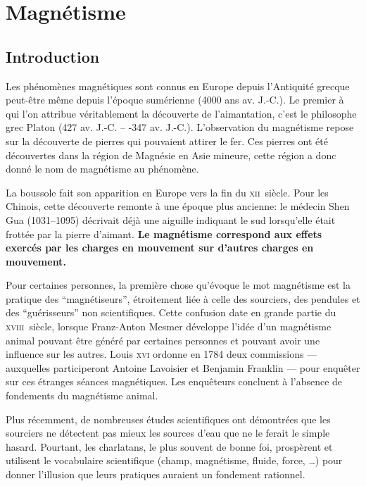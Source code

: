 \chapter{Magnétisme}
\section{Introduction}
Les phénomènes magnétiques sont connus en Europe depuis l'Antiquité grecque peut-être même depuis l'époque sumérienne (4000 ans av. J.-C.). Le premier à qui l'on attribue véritablement la découverte de l'aimantation, c'est le philosophe grec Platon (427 av. J.-C. -- -347 av. J.-C.). L'observation du magnétisme repose sur la découverte de pierres qui pouvaient attirer le fer. Ces pierres ont été découvertes dans la région de Magnésie en Asie mineure, cette région a donc donné le nom de magnétisme au phénomène.

La boussole fait son apparition en Europe vers la fin du \textsc{xii}\ieme~siècle. Pour les Chinois, cette découverte remonte à une époque plus ancienne: le médecin Shen Gua (1031--1095) décrivait déjà une aiguille indiquant le sud lorsqu'elle était frottée par la pierre d'aimant.
\textbf{Le magnétisme correspond aux effets exercés par les charges en mouvement sur d'autres charges en mouvement.}

\begin{tcolorbox}[colback=mygray1,breakable,colframe=mygray2,sharp corners=northwest,title={Magnétisme animal, Mesmer et pseudo-sciences}]
    Pour certaines personnes, la première chose qu'évoque le mot magnétisme est la pratique des \enquote{magnétiseurs}, étroitement liée à celle des sourciers, des pendules et des \enquote{guérisseurs} non scientifiques.
    Cette confusion date en grande partie du \textsc{xviii}\ieme~siècle, lorsque Franz-Anton Mesmer développe l'idée d'un magnétisme animal pouvant être généré par certaines personnes et pouvant avoir une influence sur les autres. Louis \textsc{xvi} ordonne en 1784 deux commissions --- auxquelles participeront Antoine Lavoisier et Benjamin Franklin --- pour enquêter sur ces étranges séances magnétiques. Les enquêteurs concluent à l'absence de fondements du magnétisme animal.

    Plus récemment, de nombreuses études scientifiques ont démontrées que les sourciers ne détectent pas mieux les sources d'eau que ne le ferait le simple hasard. Pourtant, les charlatans, le plus souvent de bonne foi, prospèrent et utilisent le vocabulaire scientifique (champ, magnétisme, fluide, force, …) pour donner l'illusion que leurs pratiques auraient un fondement rationnel.
\end{tcolorbox}

